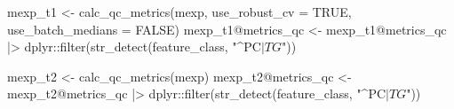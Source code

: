 \documentclass[
  letterpaper,
  DIV=11,
  numbers=noendperiod]{scrartcl}
\newenvironment{Shaded}{\begin{snugshade}}{\end{snugshade}}
\newcommand{\AttributeTok}[1]{\textcolor[rgb]{0.40,0.45,0.13}{#1}}
\newcommand{\ConstantTok}[1]{\textcolor[rgb]{0.56,0.35,0.01}{#1}}
\newcommand{\FunctionTok}[1]{\textcolor[rgb]{0.28,0.35,0.67}{#1}}
\newcommand{\NormalTok}[1]{\textcolor[rgb]{0.00,0.23,0.31}{#1}}
\newcommand{\OtherTok}[1]{\textcolor[rgb]{0.00,0.23,0.31}{#1}}
\newcommand{\SpecialCharTok}[1]{\textcolor[rgb]{0.37,0.37,0.37}{#1}}
\newcommand{\StringTok}[1]{\textcolor[rgb]{0.13,0.47,0.30}{#1}}
\begin{document}
\begin{Shaded}
\begin{Highlighting}[]
\NormalTok{mexp\_t1 }\OtherTok{\textless{}{-}} \FunctionTok{calc\_qc\_metrics}\NormalTok{(mexp, }\AttributeTok{use\_robust\_cv =} \ConstantTok{TRUE}\NormalTok{, }\AttributeTok{use\_batch\_medians =} \ConstantTok{FALSE}\NormalTok{)}
\NormalTok{mexp\_t1}\SpecialCharTok{@}\NormalTok{metrics\_qc }\OtherTok{\textless{}{-}}\NormalTok{ mexp\_t1}\SpecialCharTok{@}\NormalTok{metrics\_qc }\SpecialCharTok{|\textgreater{}} 
\NormalTok{  dplyr}\SpecialCharTok{::}\FunctionTok{filter}\NormalTok{(}\FunctionTok{str\_detect}\NormalTok{(feature\_class, }\StringTok{"\^{}PC$|TG$"}\NormalTok{))}

\NormalTok{mexp\_t2 }\OtherTok{\textless{}{-}} \FunctionTok{calc\_qc\_metrics}\NormalTok{(mexp)}
\NormalTok{mexp\_t2}\SpecialCharTok{@}\NormalTok{metrics\_qc }\OtherTok{\textless{}{-}}\NormalTok{ mexp\_t2}\SpecialCharTok{@}\NormalTok{metrics\_qc }\SpecialCharTok{|\textgreater{}} 
\NormalTok{  dplyr}\SpecialCharTok{::}\FunctionTok{filter}\NormalTok{(}\FunctionTok{str\_detect}\NormalTok{(feature\_class, }\StringTok{"\^{}PC$|TG$"}\NormalTok{))}


\end{Highlighting}
\end{Shaded}
\end{document}
